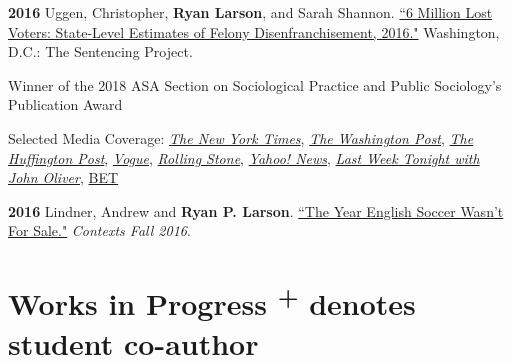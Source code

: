 \documentclass[letterpaper]{article}
\newenvironment{publist}{%
  \begin{list}{}{%
    \setlength{\leftmargin}{0cm}   %
    \setlength{\labelwidth}{2cm}     %
    \setlength{\labelsep}{0.5cm}     %
  }%
}{%
  \end{list}%
}
\renewenvironment{itemize}{
  \begin{list}{}{
    \setlength{\leftmargin}{1.5em}
  }
}{
  \end{list}
}
\begin{document}
\begin{publist}
\item[\textbf{2016}] Uggen, Christopher, \textbf{Ryan Larson}, and Sarah Shannon. \href{http://www.sentencingproject.org/wp-content/uploads/2016/10/6-Million-Lost-Voters.pdf}{``6 Million Lost Voters: State-Level Estimates of Felony Disenfranchisement, 2016."} Washington, D.C.: The Sentencing Project.
\begin{itemize}
\item Winner of the 2018 ASA Section on Sociological Practice and Public Sociology's Publication Award
\item Selected Media Coverage: \href{http://www.nytimes.com/interactive/2016/10/06/us/unequal-effect-of-laws-that-block-felons-from-voting.html?_r=0}{\textit{The New York Times}}, \href{https://www.washingtonpost.com/news/powerpost/wp/2016/10/07/6-million-citizens-including-1-in-13-african-americans-are-blocked-from-voting-because-of-felonies/}{\textit{The Washington Post}}, \href{http://www.huffingtonpost.com/harlan-green/trump-the-terrible-demago_b_12392904.html}{\textit{The Huffington Post}}, \href{http://www.vogue.com/13489654/2016-presidential-election-felony-disenfranchisement/}{\textit{Vogue}}, \href{http://www.rollingstone.com/politics/features/six-million-adults-who-wont-influence-this-election-w443693}{\textit{Rolling Stone}}, \href{https://www.yahoo.com/news/more-6-million-americans-t-vote-election-105300558.html}{\textit{Yahoo! News}}, \href{https://www.youtube.com/watch?time_continue=2&v=NpPyLcQ2vdI}{\textit{Last Week Tonight with John Oliver}}, \href{https://www.bet.com/article/0g0u0z/the-impact-of-felony-disenfranchisement-on-black-communities-a-deep-dive-into-modern-day-voter-suppression}{BET}
\end{itemize}

\item[\textbf{2016}] Lindner, Andrew and \textbf{Ryan P. Larson}. \href{http://journals.sagepub.com/doi/full/10.1177/1536504216685127}{``The Year English Soccer Wasn't For Sale."} \textit{Contexts Fall 2016}. 

\end{publist}


\section*{\textbf{Works in Progress} \scriptsize{\textsuperscript{+} denotes student co-author}}
\end{document}
